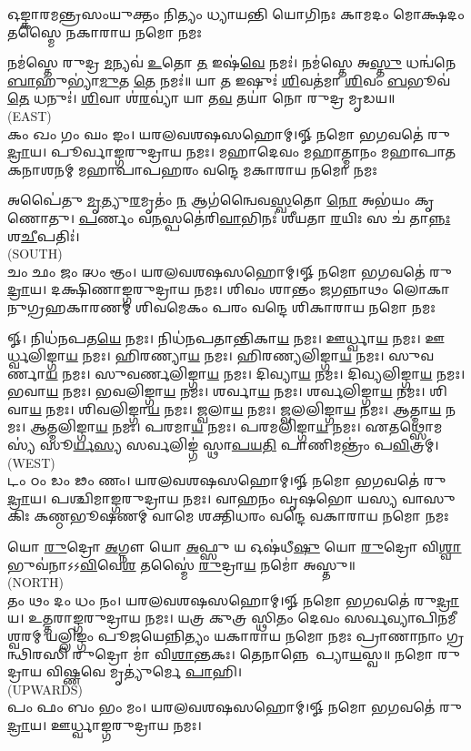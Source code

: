 


\twolineshloka
{𑌓𑌙𑍍𑌕𑌾𑌰𑌮𑌨𑍍𑌤𑍍𑌰𑌸𑌂𑌯𑍁𑌕𑍍𑌤𑌂 𑌨𑌿𑌤𑍍𑌯𑌂 𑌧𑍍𑌯𑌾𑌯𑌨𑍍𑌤𑌿 𑌯𑍋𑌗𑌿𑌨𑌃}
{𑌕𑌾𑌮𑌦𑌂 𑌮𑍋𑌕𑍍𑌷𑌦𑌂 𑌤𑌸𑍍𑌮𑍈 𑌨𑌕𑌾𑌰𑌾𑌯 𑌨𑌮𑍋 𑌨𑌮𑌃}

𑌨𑌮॑𑌸𑍍𑌤𑍇 𑌰𑍁𑌦𑍍𑌰 \ul{𑌮}𑌨𑍍𑌯𑌵॑ \ul{𑌉}𑌤𑍋 \ul{𑌤} 𑌇𑌷॑\ul{𑌵𑍇} 𑌨𑌮𑌃॑। 𑌨𑌮॑𑌸𑍍𑌤𑍇 𑌅\ul{𑌸𑍍𑌤𑍁} 𑌧𑌨𑍍𑌵॑𑌨𑍇 \ul{𑌬𑌾}𑌹𑍁𑌭𑍍𑌯𑌾॑\ul{𑌮𑍁}𑌤 \ul{𑌤𑍇} 𑌨𑌮𑌃॑॥ 𑌯𑌾 \ul{𑌤} 𑌇𑌷𑍁𑌃॑ \ul{𑌶𑌿}𑌵𑌤॑𑌮𑌾 \ul{𑌶𑌿}𑌵𑌂 \ul{𑌬}𑌭𑍂𑌵॑ \ul{𑌤𑍇} 𑌧𑌨𑍁𑌃॑। \ul{𑌶𑌿}𑌵𑌾 𑌶॑\ul{𑌰}𑌵𑍍𑌯𑌾॑ 𑌯𑌾 𑌤\ul{𑌵} 𑌤𑌯𑌾॑ 𑌨𑍋 𑌰𑍁𑌦𑍍𑌰 𑌮𑍃𑌡𑌯॥\\
{\scriptsize (EAST)}\\
𑌕𑌂 𑌖𑌂 𑌗𑌂 𑌘𑌂 𑌙𑌂। 𑌯𑌰𑌲𑌵𑌶𑌷𑌸𑌹𑍋𑌮𑍍।𑍐 𑌨𑌮𑍋 𑌭𑌗𑌵𑌤𑍇॑ 𑌰𑍁\ul{𑌦𑍍𑌰𑌾}𑌯। 𑌪𑍂𑌰𑍍𑌵𑌾𑌙𑍍𑌗𑌰𑍁𑌦𑍍𑌰𑌾𑌯 𑌨𑌮𑌃। 
\medskip
\twolineshloka
{𑌮𑌹𑌾𑌦𑍇𑌵𑌂 𑌮𑌹𑌾𑌤𑍍𑌮𑌾𑌨𑌂 𑌮𑌹𑌾𑌪𑌾𑌤𑌕𑌨𑌾𑌶𑌨𑌮𑍍}
{𑌮𑌹𑌾𑌪𑌾𑌪𑌹𑌰𑌂 𑌵𑌨𑍍𑌦𑍇 𑌮𑌕𑌾𑌰𑌾𑌯 𑌨𑌮𑍋 𑌨𑌮𑌃}

𑌅𑌪𑍈॑𑌤𑍁 \ul{𑌮𑍃}𑌤𑍍𑌯𑍁\ul{𑌰}𑌮𑍃𑌤𑌂॑ \ul{𑌨} 𑌆𑌗॑𑌨𑍍𑌵𑍈𑌵\ul{𑌸𑍍𑌵}𑌤𑍋 \ul{𑌨𑍋} 𑌅𑌭॑𑌯𑌂 𑌕𑍃𑌣𑍋𑌤𑍁।
\ul{𑌪}𑌰𑍍𑌣𑌂 𑌵\ul{𑌨}𑌸𑍍𑌪𑌤𑍇॑𑌰𑌿\ul{𑌵𑌾}𑌭𑌿𑌨𑌃॑ 𑌶𑍀𑌯𑌤𑌾 \ul{𑌰}𑌯𑌿𑌃 𑌸 𑌚॑ 𑌤𑌾\ul{𑌨𑍍𑌨𑌃} 𑌶\ul{𑌚𑍀}𑌪𑌤𑌿𑌃॑।\\
{\scriptsize (SOUTH)}\\
𑌚𑌂 𑌛𑌂 𑌜𑌂 𑌝𑌂 𑌞𑌂। 𑌯𑌰𑌲𑌵𑌶𑌷𑌸𑌹𑍋𑌮𑍍।𑍐 𑌨𑌮𑍋 𑌭𑌗𑌵𑌤𑍇॑ 𑌰𑍁\ul{𑌦𑍍𑌰𑌾}𑌯। 𑌦𑌕𑍍𑌷𑌿𑌣𑌾𑌙𑍍𑌗𑌰𑍁𑌦𑍍𑌰𑌾𑌯 𑌨𑌮𑌃।
\medskip
\twolineshloka
{𑌶𑌿𑌵𑌂 𑌶𑌾𑌨𑍍𑌤𑌂 𑌜𑌗𑌨𑍍𑌨𑌾𑌥𑌂 𑌲𑍋𑌕𑌾𑌨𑍁𑌗𑍍𑌰𑌹𑌕𑌾𑌰𑌣𑌮𑍍}
{𑌶𑌿𑌵𑌮𑍇𑌕𑌂 𑌪𑌰𑌂 𑌵𑌨𑍍𑌦𑍇 𑌶𑌿𑌕𑌾𑌰𑌾𑌯 𑌨𑌮𑍋 𑌨𑌮𑌃}

𑍐। 𑌨𑌿𑌧॑𑌨𑌪𑌤\ul{𑌯𑍇} 𑌨𑌮𑌃। 𑌨𑌿𑌧॑𑌨𑌪𑌤𑌾𑌨𑍍𑌤𑌿𑌕𑌾\ul{𑌯} 𑌨𑌮𑌃। 𑌊𑌰𑍍𑌧𑍍𑌵𑌾\ul{𑌯} 𑌨𑌮𑌃। 𑌊𑌰𑍍𑌧𑍍𑌵𑌲𑌿𑌙𑍍𑌗𑌾\ul{𑌯} 𑌨𑌮𑌃। 𑌹𑌿𑌰𑌣𑍍𑌯𑌾\ul{𑌯} 𑌨𑌮𑌃। 𑌹𑌿𑌰𑌣𑍍𑌯𑌲𑌿𑌙𑍍𑌗𑌾\ul{𑌯} 𑌨𑌮𑌃। 𑌸𑍁𑌵𑌰𑍍𑌣𑌾\ul{𑌯} 𑌨𑌮𑌃। 𑌸𑍁𑌵𑌰𑍍𑌣𑌲𑌿𑌙𑍍𑌗𑌾\ul{𑌯} 𑌨𑌮𑌃। 𑌦𑌿𑌵𑍍𑌯𑌾\ul{𑌯} 𑌨𑌮𑌃। 𑌦𑌿𑌵𑍍𑌯𑌲𑌿𑌙𑍍𑌗𑌾\ul{𑌯} 𑌨𑌮𑌃। 𑌭𑌵𑌾\ul{𑌯} 𑌨𑌮𑌃। 𑌭𑌵𑌲𑌿𑌙𑍍𑌗𑌾\ul{𑌯} 𑌨𑌮𑌃। 𑌶𑌰𑍍𑌵𑌾\ul{𑌯} 𑌨𑌮𑌃। 𑌶𑌰𑍍𑌵𑌲𑌿𑌙𑍍𑌗𑌾\ul{𑌯} 𑌨𑌮𑌃। 𑌶𑌿𑌵𑌾\ul{𑌯} 𑌨𑌮𑌃। 𑌶𑌿𑌵𑌲𑌿𑌙𑍍𑌗𑌾\ul{𑌯} 𑌨𑌮𑌃। 𑌜𑍍𑌵𑌲𑌾\ul{𑌯} 𑌨𑌮𑌃। 𑌜𑍍𑌵𑌲𑌲𑌿𑌙𑍍𑌗𑌾\ul{𑌯} 𑌨𑌮𑌃। 𑌆𑌤𑍍𑌮𑌾\ul{𑌯} 𑌨𑌮𑌃। 𑌆𑌤𑍍𑌮𑌲𑌿𑌙𑍍𑌗𑌾\ul{𑌯} 𑌨𑌮𑌃। 𑌪𑌰𑌮𑌾\ul{𑌯} 𑌨𑌮𑌃। 𑌪𑌰𑌮𑌲𑌿𑌙𑍍𑌗𑌾\ul{𑌯} 𑌨𑌮𑌃। 𑌏𑌤𑌥𑍍𑌸𑍋𑌮𑌸𑍍𑌯॑ 𑌸𑍂\ul{𑌰𑍍𑌯}\ul{𑌸𑍍𑌯} 𑌸𑌰𑍍𑌵𑌲𑌿𑌙𑍍𑌗॑ 𑌸𑍍𑌥𑌾\ul{𑌪}\ul{𑌯}\ul{𑌤𑌿} 𑌪𑌾𑌣𑌿𑌮𑌨𑍍𑌤𑍍𑌰𑌂॑ 𑌪\ul{𑌵𑌿}𑌤𑍍𑌰𑌮𑍍।\\
{\scriptsize (WEST)}\\
𑌟𑌂 𑌠𑌂 𑌡𑌂 𑌢𑌂 𑌣𑌂। 𑌯𑌰𑌲𑌵𑌶𑌷𑌸𑌹𑍋𑌮𑍍।𑍐 𑌨𑌮𑍋 𑌭𑌗𑌵𑌤𑍇॑ 𑌰𑍁\ul{𑌦𑍍𑌰𑌾}𑌯। 𑌪𑌶𑍍𑌚𑌿𑌮𑌾𑌙𑍍𑌗𑌰𑍁𑌦𑍍𑌰𑌾𑌯 𑌨𑌮𑌃।
\medskip
\twolineshloka
{𑌵𑌾𑌹𑌨𑌂 𑌵𑍃𑌷𑌭𑍋 𑌯𑌸𑍍𑌯 𑌵𑌾𑌸𑍁𑌕𑌿𑌃 𑌕𑌣𑍍𑌠𑌭𑍂𑌷𑌣𑌮𑍍}
{𑌵𑌾𑌮𑍇 𑌶𑌕𑍍𑌤𑌿𑌧𑌰𑌂 𑌵𑌨𑍍𑌦𑍇 𑌵𑌕𑌾𑌰𑌾𑌯 𑌨𑌮𑍋 𑌨𑌮𑌃}

𑌯𑍋 \ul{𑌰𑍁}𑌦𑍍𑌰𑍋 \ul{𑌅}𑌗𑍍𑌨𑍗 𑌯𑍋 \ul{𑌅}𑌫𑍍𑌸𑍁 𑌯 𑌓𑌷॑𑌧𑍀\ul{𑌷𑍁} 𑌯𑍋 \ul{𑌰𑍁}𑌦𑍍𑌰𑍋 𑌵𑌿\ul{𑌶𑍍𑌵𑌾} 𑌭𑍁𑌵॑𑌨𑌾𑌽𑌽\ul{𑌵𑌿}𑌵𑍇\ul{𑌶} 𑌤𑌸𑍍𑌮𑍈॑ \ul{𑌰𑍁}𑌦𑍍𑌰𑌾\ul{𑌯} 𑌨𑌮𑍋॑ 𑌅𑌸𑍍𑌤𑍁॥ \\
{\scriptsize (NORTH)}\\
𑌤𑌂 𑌥𑌂 𑌦𑌂 𑌧𑌂 𑌨𑌂। 𑌯𑌰𑌲𑌵𑌶𑌷𑌸𑌹𑍋𑌮𑍍।𑍐 𑌨𑌮𑍋 𑌭𑌗𑌵𑌤𑍇॑ 𑌰𑍁\ul{𑌦𑍍𑌰𑌾}𑌯। 𑌉𑌤𑍍𑌤𑌰𑌾𑌙𑍍𑌗𑌰𑍁𑌦𑍍𑌰𑌾𑌯 𑌨𑌮𑌃।
\medskip
\twolineshloka
{𑌯𑌤𑍍𑌰 𑌕𑍁𑌤𑍍𑌰 𑌸𑍍𑌥𑌿𑌤𑌂 𑌦𑍇𑌵𑌂 𑌸𑌰𑍍𑌵𑌵𑍍𑌯𑌾𑌪𑌿𑌨𑌮𑍀𑌶𑍍𑌵𑌰𑌮𑍍}
{𑌯𑌲𑍍𑌲𑌿𑌙𑍍𑌗𑌂 𑌪𑍂𑌜𑌯𑍇𑌨𑍍𑌨𑌿𑌤𑍍𑌯𑌂 𑌯𑌕𑌾𑌰𑌾𑌯 𑌨𑌮𑍋 𑌨𑌮𑌃}
𑌪𑍍𑌰𑌾𑌣𑌾𑌨𑌾𑌂 𑌗𑍍𑌰𑌨𑍍𑌥𑌿𑌰𑌸𑌿 𑌰𑍁𑌦𑍍𑌰𑍋 𑌮𑌾॑ 𑌵𑌿\ul{𑌶𑌾}𑌨𑍍𑌤𑌕𑌃। 𑌤𑍇𑌨𑌾𑌨𑍍𑌨𑍇𑌨𑌾᳚𑌪𑍍𑌯𑌾\ul{𑌯}𑌸𑍍𑌵॥ 𑌨𑌮𑍋 𑌰𑍁𑌦𑍍𑌰𑌾𑌯 𑌵𑌿𑌷𑍍𑌣𑌵𑍇 𑌮𑍃𑌤𑍍𑌯𑍁॑𑌰𑍍𑌮𑍇 \ul{𑌪𑌾}𑌹𑌿।\\
{\scriptsize (UPWARDS)}\\
𑌪𑌂 𑌫𑌂 𑌬𑌂 𑌭𑌂 𑌮𑌂। 𑌯𑌰𑌲𑌵𑌶𑌷𑌸𑌹𑍋𑌮𑍍।𑍐 𑌨𑌮𑍋 𑌭𑌗𑌵𑌤𑍇॑ 𑌰𑍁\ul{𑌦𑍍𑌰𑌾}𑌯। 𑌊𑌰𑍍𑌧𑍍𑌵𑌾𑌙𑍍𑌗𑌰𑍁𑌦𑍍𑌰𑌾𑌯 𑌨𑌮𑌃।

